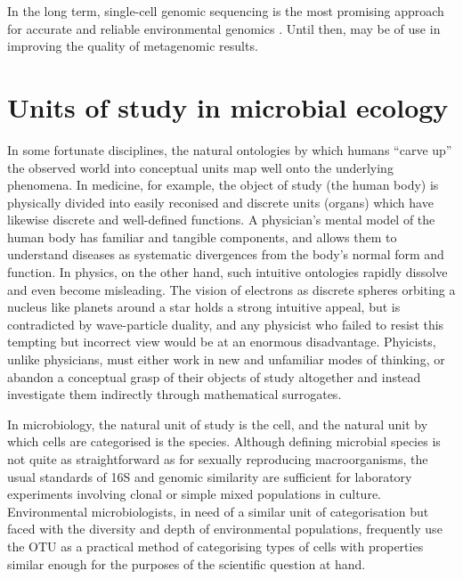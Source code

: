 In the long term, single-cell genomic sequencing is the most promising approach for accurate and reliable environmental genomics \cite{Blainey:2013dp}.
Until then,  may be of use in improving the quality of metagenomic results.

\section{Units of study in microbial ecology}

In some fortunate disciplines, the natural ontologies by which humans ``carve up'' the observed world into conceptual units map well onto the underlying phenomena.
In medicine, for example, the object of study (the human body) is physically divided into easily reconised and discrete units (organs) which have likewise discrete and well-defined functions.
A physician's mental model of the human body has familiar and tangible components, and allows them to understand diseases as systematic divergences from the body's normal form and function.
In physics, on the other hand, such intuitive ontologies rapidly dissolve and even become misleading.
The vision of electrons as discrete spheres orbiting a nucleus like planets around a star holds a strong intuitive appeal, but is contradicted by wave-particle duality, and any physicist who failed to resist this tempting but incorrect view would be at an enormous disadvantage.
Phyicists, unlike physicians, must either work in new and unfamiliar modes of thinking, or abandon a conceptual grasp of their objects of study altogether and instead investigate them indirectly through mathematical surrogates.

In microbiology, the natural unit of study is the cell, and the natural unit by which cells are categorised is the species.
Although defining microbial species is not quite as straightforward as for sexually reproducing macroorganisms, the usual standards of 16S and genomic similarity are sufficient for laboratory experiments involving clonal or simple mixed populations in culture.
Environmental microbiologists, in need of a similar unit of categorisation but faced with the diversity and depth of environmental populations, frequently use the \ac{OTU} as a practical method of categorising types of cells with properties similar enough for the purposes of the scientific question at hand.

